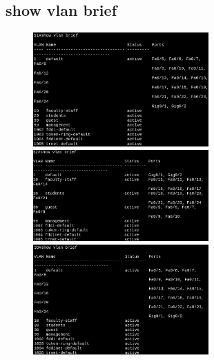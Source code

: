 \documentclass[letterpaper,12pt]{article}
\begin{document}
\begin{sloppypar}
\subsection{show vlan brief}
\begin{figure}[H]
    \centering
    \includegraphics[width=0.6\textwidth]{vlanbrief1.png}
    \vspace{0.3cm}\\ 
    \includegraphics[width=0.6\textwidth]{vlanbrief2.png}
    \vspace{0.3cm}\\ 
    \includegraphics[width=0.6\textwidth]{vlanbrief3.png}
\end{figure}
\newpage

\end{sloppypar}
\end{document}
